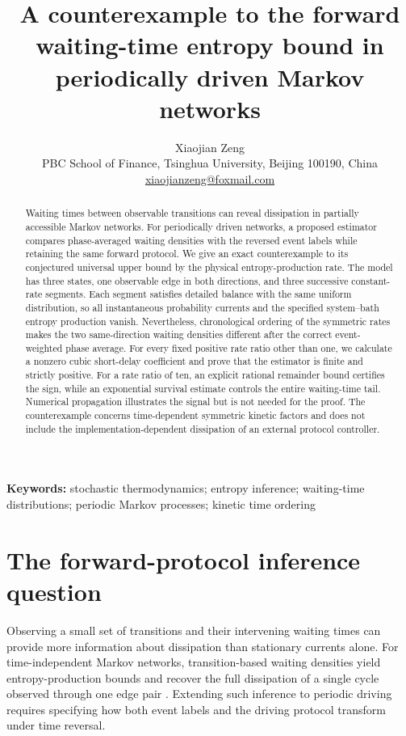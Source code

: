 \documentclass[11pt,a4paper]{article}
\title{A counterexample to the forward waiting-time entropy bound in periodically driven Markov networks}
\author{Xiaojian Zeng\\[3pt]
\small PBC School of Finance, Tsinghua University, Beijing 100190, China\\
\small\href{mailto:xiaojianzeng@foxmail.com}{xiaojianzeng@foxmail.com}}
\date{}
\begin{document}
\maketitle
\begin{abstract}
Waiting times between observable transitions can reveal dissipation in partially accessible Markov networks. For periodically driven networks, a proposed estimator compares phase-averaged waiting densities with the reversed event labels while retaining the same forward protocol. We give an exact counterexample to its conjectured universal upper bound by the physical entropy-production rate. The model has three states, one observable edge in both directions, and three successive constant-rate segments. Each segment satisfies detailed balance with the same uniform distribution, so all instantaneous probability currents and the specified system--bath entropy production vanish. Nevertheless, chronological ordering of the symmetric rates makes the two same-direction waiting densities different after the correct event-weighted phase average. For every fixed positive rate ratio other than one, we calculate a nonzero cubic short-delay coefficient and prove that the estimator is finite and strictly positive. For a rate ratio of ten, an explicit rational remainder bound certifies the sign, while an exponential survival estimate controls the entire waiting-time tail. Numerical propagation illustrates the signal but is not needed for the proof. The counterexample concerns time-dependent symmetric kinetic factors and does not include the implementation-dependent dissipation of an external protocol controller.
\end{abstract}
\noindent\textbf{Keywords:} stochastic thermodynamics; entropy inference; waiting-time distributions; periodic Markov processes; kinetic time ordering

\section{The forward-protocol inference question}
Observing a small set of transitions and their intervening waiting times can provide more information about dissipation than stationary currents alone. For time-independent Markov networks, transition-based waiting densities yield entropy-production bounds and recover the full dissipation of a single cycle observed through one edge pair \cite{vanderMeer2022}. Extending such inference to periodic driving requires specifying how both event labels and the driving protocol transform under time reversal.
\end{document}
